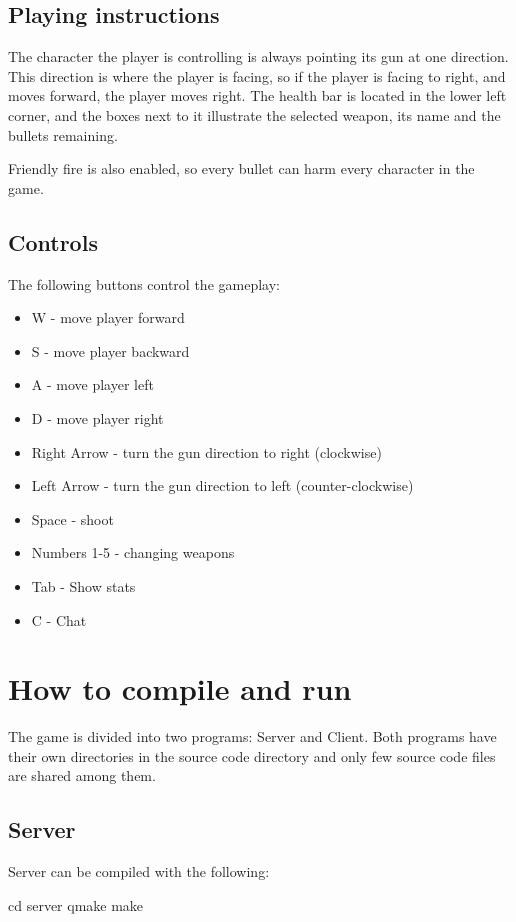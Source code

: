 \documentclass[a4paper,12pt,titlepage]{article}
\begin{document}
\subsection{Playing instructions}
The character the player is controlling is always pointing its gun at one direction. This direction is where the player is facing, so if the player is facing to right, and moves forward, the player moves right. The health bar is located in the lower left corner, and the boxes next to it illustrate the selected weapon, its name and the bullets remaining.

Friendly fire is also enabled, so every bullet can harm every character in the game.
\subsection{Controls}
The following buttons control the gameplay:
\begin{itemize}
\item W - move player forward
\item S - move player backward
\item A - move player left
\item D - move player right
\item Right Arrow - turn the gun direction to right (clockwise)
\item Left Arrow - turn the gun direction to left (counter-clockwise)
\item Space - shoot
\item Numbers 1-5 - changing weapons
\item Tab - Show stats
\item C - Chat
\end{itemize}

\section{How to compile and run}

The game is divided into two programs: Server and Client. Both programs have their own directories in the source code directory and only few source code files are shared among them.

\subsection{Server}

Server can be compiled with the following:
    \begin{verbatimtab}[3]
        cd server
        qmake
        make
    \end{verbatimtab}
\end{document}
